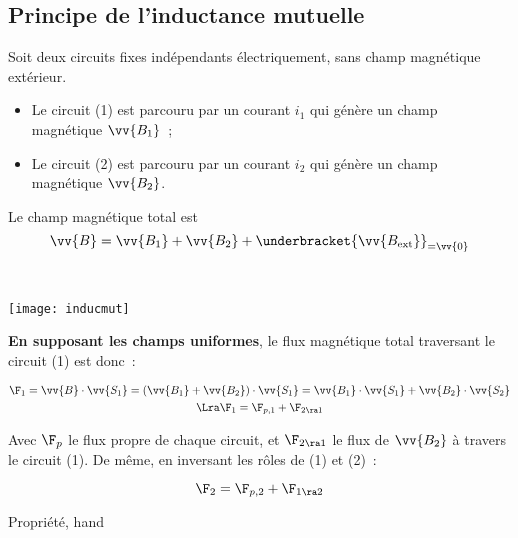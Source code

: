 \documentclass[../main/main.tex]{subfiles}
\begin{document}
\subsection{Principe de l'inductance mutuelle}
\label{ssec:prpeinducmut}
\noindent
\begin{minipage}[t]{.6\linewidth}
	Soit deux circuits fixes indépendants électriquement, sans champ magnétique
	extérieur.
	\begin{itemize}[label=$\diamond$, leftmargin=10pt]
		\item Le circuit (1) est parcouru par un courant $i_1$ qui génère un champ
		      magnétique $\vv{B_1}$~;
		\item Le circuit (2) est parcouru par un courant $i_2$ qui génère un champ
		      magnétique $\vv{B_2}$.
	\end{itemize}
	Le champ magnétique total est
	\[
		\vv{B} = \vv{B_1} + \vv{B_2} + \underbracket{\vv{B_{\rm ext}}}_{=\vv{0}}
	\]
\end{minipage}
\hfill
\begin{minipage}[t]{.4\linewidth}
	~
	\vspace*{-20pt}
	\begin{center}
		\texttt{[image: inducmut]}
		\label{fig:inducmut}
	\end{center}
\end{minipage}
\textbf{En supposant les champs uniformes}, le flux magnétique total traversant
le circuit (1) est donc~:
\begin{hide}
	\begin{gather*}
		\F_1 = \vv{B}\cdot \vv{S_1} = \left(\vv{B_1}+\vv{B_2}\right)\cdot \vv{S_1}
		= \vv{B_1}\cdot \vv{S_1}+\vv{B_2}\cdot \vv{S_2}
		\\\Lra
		\F_1 = \F_{p,1} + \F_{2\ra 1}
	\end{gather*}
\end{hide}
Avec $\F_p$ le flux propre de chaque circuit, et $\F_{2\ra 1}$ le flux de
$\vv{B_2}$ à travers le circuit (1). De même, en inversant les rôles de (1) et
(2)~:
\begin{hide}
	\[
		\F_2 = \F_{p,2} + \F_{1\ra 2}
	\]
\end{hide}

\begin{tprop}{Propriété, hand}
\end{tprop}
\end{document}
